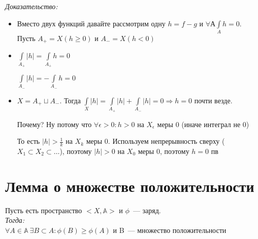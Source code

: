 \documentclass[paper=a4, fontsize=14pt]{report}
\begin{document}
\emph{Доказательство: }

		\begin{itemize}
			\item
			Вместо двух функций давайте рассмотрим одну $h = f - g$ и $\forall А \int\limits_A h = 0$. Пусть $A_{+} = X(h\geq 0)$ и $A_- = X(h < 0)$
			\item
			$\int\limits_{A_+} |h| = \int\limits_{A_+} h = 0$ \par
			$\int\limits_{A_-} |h| = -\int\limits_{A_-} h = 0$
			\item
			$X = A_+ \sqcup A_-$. Тогда $\int\limits_X |h| = \int\limits_{A_+} |h| + \int\limits_{A_-} |h| = 0 \Rightarrow h = 0$ почти везде.
			
			Почему? Ну потому что $\forall \epsilon > 0 : h > 0$ на $X_{\epsilon}$ меры $0$ (иначе интеграл не $0$)
			
			То есть $|h| > \frac{1}{k}$ на $X_k$ меры $0$. Используем непрерывность сверху ($X_1 \subset X_2 \subset \ldots $), поэтому $|h| > 0$ на $X_0$ меры $0$, поэтому $h = 0$ пв
\end{itemize}

\section{Лемма о множестве положительности}
	Пусть есть пространство $<X, \mathbb{A}>$ и $\phi$~--- заряд.\\
	\emph{Тогда:}\\
		$\forall A\in \mathbb{A}\ \exists B \subset A : \phi(B) \geq \phi(A)$ и B~--- множество положительности \\
\end{document}
